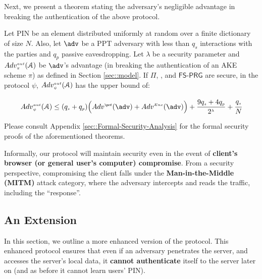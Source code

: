 Next, we present a theorem stating the adversary's negligible advantage in breaking the authentication of the above protocol.



\begin{theorem} [Authentication]
Let PIN be an element distributed uniformly at random over a finite dictionary of size $N$. Also, 
let $\adv$ be a PPT adversary with less than $q_s$ interactions with the parties and $q_p$ passive eavesdropping. Let $\lambda$ be a security parameter and $Adv_{\scriptscriptstyle\pi}^{\scriptscriptstyle aut}(\mathcal{A})$ be  $\adv$'s advantage (in breaking the authentication of an AKE scheme $\pi$) as defined in Section \ref{sec::model}.  If  $\Pi$,  \prf,  and  $\mathsf{FS\text{-}PRG}$ are secure, in the protocol $\psi$, $Adv_{\scriptscriptstyle \psi}^{\scriptscriptstyle aut}(\mathcal{A})$ has the upper bound of:  

  \begin{equation*}
 Adv_{\sss \psi}^{\sss aut}(\A)  \leq (q_{\sss s} + q_{\sss p})\Big(Adv^{\sss\prf}(\adv)+Adv^{\sss Enc}(\adv)\Big)+\frac{9q_{\sss s}+4q_{\sss p}}{2^{\sss\lambda}}+  \cfrac{q_{\sss s}}{N}
 \end{equation*}
%
\end{theorem}





Please consult Appendix \ref{sec::Formal-Security-Analysis} for the formal security proofs of the aforementioned theorems. 



Informally, our protocol will maintain security even in the event of \textbf{client's browser (or general user’s computer) compromise}. From a security perspective, compromising the client falls under the \textbf{Man-in-the-Middle (MITM)} attack category, where the adversary intercepts and reads the traffic, including the ``response''.


\subsection{An Extension}


In this section, we outline a more enhanced version of the protocol. This enhanced protocol ensures that even if an adversary penetrates the server, and accesses the server's local data, it \textbf{cannot authenticate} itself to the server later on (and as before it cannot learn users' PIN). %


